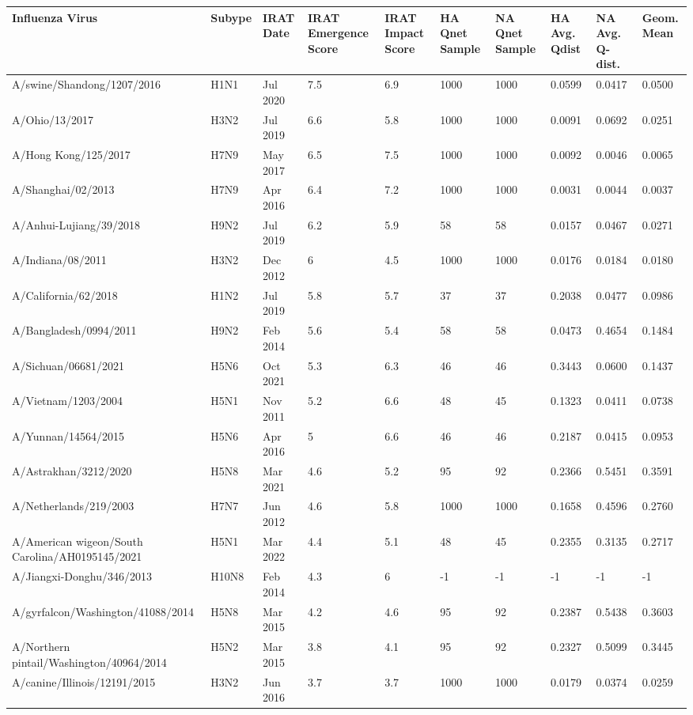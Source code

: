\begin{tabular}{L{1.9in}|L{.35in}|L{.35in}|L{.35in}|L{.35in}|L{.35in}|L{.35in}|L{.35in}|L{.35in}|L{.35in}}\hline
Influenza Virus & Subype & IRAT Date &IRAT Emergence Score &IRAT Impact Score &HA Qnet Sample &NA Qnet Sample &HA Avg. Qdist &NA Avg. Q-dist. &Geom. Mean \\\hline
 A/swine/Shandong/1207/2016 &H1N1& Jul  2020 &7.5&6.9&1000&1000&0.0599&0.0417&0.0500\\\hline
 A/Ohio/13/2017 &H3N2& Jul  2019 &6.6&5.8&1000&1000&0.0091&0.0692&0.0251\\\hline
 A/Hong  Kong/125/2017 &H7N9& May  2017 &6.5&7.5&1000&1000&0.0092&0.0046&0.0065\\\hline
 A/Shanghai/02/2013 &H7N9& Apr  2016 &6.4&7.2&1000&1000&0.0031&0.0044&0.0037\\\hline
 A/Anhui-Lujiang/39/2018 &H9N2& Jul  2019 &6.2&5.9&58&58&0.0157&0.0467&0.0271\\\hline
 A/Indiana/08/2011 &H3N2& Dec  2012 &6&4.5&1000&1000&0.0176&0.0184&0.0180\\\hline
 A/California/62/2018 &H1N2& Jul  2019 &5.8&5.7&37&37&0.2038&0.0477&0.0986\\\hline
 A/Bangladesh/0994/2011 &H9N2& Feb  2014 &5.6&5.4&58&58&0.0473&0.4654&0.1484\\\hline
 A/Sichuan/06681/2021 &H5N6& Oct  2021 &5.3&6.3&46&46&0.3443&0.0600&0.1437\\\hline
 A/Vietnam/1203/2004 &H5N1& Nov  2011 &5.2&6.6&48&45&0.1323&0.0411&0.0738\\\hline
 A/Yunnan/14564/2015 &H5N6& Apr  2016 &5&6.6&46&46&0.2187&0.0415&0.0953\\\hline
 A/Astrakhan/3212/2020 &H5N8& Mar  2021 &4.6&5.2&95&92&0.2366&0.5451&0.3591\\\hline
 A/Netherlands/219/2003 &H7N7& Jun  2012 &4.6&5.8&1000&1000&0.1658&0.4596&0.2760\\\hline
 A/American  wigeon/South  Carolina/AH0195145/2021 &H5N1& Mar  2022 &4.4&5.1&48&45&0.2355&0.3135&0.2717\\\hline
 A/Jiangxi-Donghu/346/2013 &H10N8& Feb  2014 &4.3&6&-1&-1&-1&-1&-1\\\hline
 A/gyrfalcon/Washington/41088/2014 &H5N8& Mar  2015 &4.2&4.6&95&92&0.2387&0.5438&0.3603\\\hline
 A/Northern  pintail/Washington/40964/2014 &H5N2& Mar  2015 &3.8&4.1&95&92&0.2327&0.5099&0.3445\\\hline
 A/canine/Illinois/12191/2015 &H3N2& Jun  2016 &3.7&3.7&1000&1000&0.0179&0.0374&0.0259\\\hline

\end{tabular}
